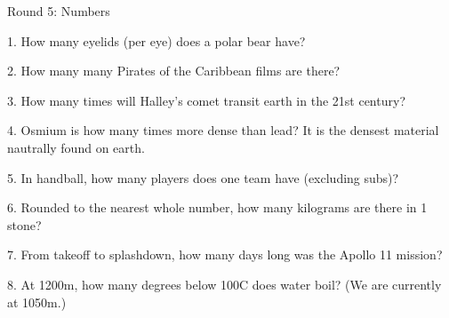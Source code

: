 \begin{frame}
\begin{center}
\Huge
Round 5: Numbers
\end{center}
\end{frame}
\begin{frame}
\begin{center}
\Large
1. How many eyelids (per eye) does a polar bear have?
\end{center}
\end{frame}
\begin{frame}
\begin{center}
\Large
2. How many many Pirates of the Caribbean films are there?
\end{center}
\end{frame}
\begin{frame}
\begin{center}
\Large
3. How many times will Halley's comet transit earth in the 21st century?
\end{center}
\end{frame}
\begin{frame}
\begin{center}
\Large
4. Osmium is how many times more dense than lead? It is the densest material nautrally found on earth.
\end{center}
\end{frame}
\begin{frame}
\begin{center}
\Large
5. In handball, how many players does one team have (excluding subs)?
\end{center}
\end{frame}
\begin{frame}
\begin{center}
\Large
6. Rounded to the nearest whole number, how many kilograms are there in 1 stone?
\end{center}
\end{frame}
\begin{frame}
\begin{center}
\Large
7. From takeoff to splashdown, how many days long was the Apollo 11 mission?
\end{center}
\end{frame}
\begin{frame}
\begin{center}
\Large
8. At 1200m, how many degrees below 100\textdegree C does water boil? (We are currently at 1050m.)
\end{center}
\end{frame}
